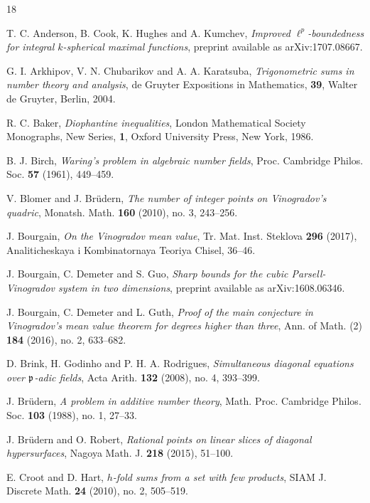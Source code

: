 \documentclass[12pt,reqno]{amsart}
\theoremstyle{definition}
\theoremstyle{remark}
\numberwithin{equation}{section}
\begin{document}

\providecommand{\bysame}{\leavevmode\hbox to3em{\hrulefill}\thinspace}
\begin{thebibliography}{18}

T. C. Anderson, B. Cook, K. Hughes and A. Kumchev, \emph{Improved 
$\ell^p$-boundedness for integral $k$-spherical maximal functions}, preprint available as 
arXiv:1707.08667.

G. I. Arkhipov, V. N. Chubarikov and A. A. Karatsuba, \emph{Trigonometric sums in number 
theory and analysis}, de Gruyter Expositions in Mathematics, \textbf{39}, Walter de Gruyter, 
Berlin, 2004.

R. C. Baker, \emph{Diophantine inequalities}, London Mathematical Society Monographs, 
New Series, \textbf{1}, Oxford University Press, New York, 1986.

B. J. Birch, \emph{Waring's problem in algebraic number fields}, Proc. Cambridge Philos. 
Soc. \textbf{57} (1961), 449--459.

V. Blomer and J. Br\"udern, \emph{The number of integer points on Vinogradov's quadric},  
Monatsh. Math. \textbf{160} (2010), no. 3, 243--256.

 J. Bourgain, \emph{On the Vinogradov mean value}, Tr. Mat. Inst. 
Steklova \textbf{296} (2017), Analiticheskaya i Kombinatornaya Teoriya Chisel, 36--46.

J. Bourgain, C. Demeter and S. Guo, \emph{Sharp bounds for the cubic Parsell-Vinogradov 
system in two dimensions}, preprint available as arXiv:1608.06346.

J. Bourgain, C. Demeter and L. Guth, \emph{Proof of the main conjecture in Vinogradov's 
mean value theorem for degrees higher than three}, Ann. of Math. (2) \textbf{184} 
(2016), no. 2, 633--682.

D. Brink, H. Godinho and P. H. A. Rodrigues, \emph{Simultaneous diagonal equations over
${\mathfrak p}$-adic fields}, Acta Arith. \textbf{132} (2008), no. 4, 393--399.

J. Br\"udern, \emph{A problem in additive number theory}, Math. Proc. Cambridge Philos. 
Soc. \textbf{103} (1988), no. 1, 27--33.

J. Br\"udern and O. Robert, \emph{Rational points on linear slices of diagonal 
hypersurfaces}, Nagoya Math. J. \textbf{218} (2015), 51--100.

 E. Croot and D. Hart, \emph{$h$-fold sums from a set with few 
products}, SIAM J. Discrete Math. \textbf{24} (2010), no. 2, 505--519.


\end{thebibliography}
\end{document}
